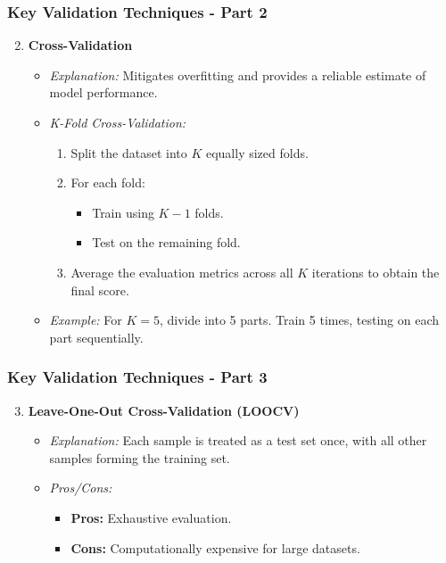 \documentclass[aspectratio=169]{beamer}
\begin{document}
\begin{frame}[fragile]
    \frametitle{Key Validation Techniques - Part 2}
    \begin{enumerate}
        \setcounter{enumi}{1} %
        \item \textbf{Cross-Validation}
        \begin{itemize}
            \item \textit{Explanation:} Mitigates overfitting and provides a reliable estimate of model performance.
            \item \textit{K-Fold Cross-Validation:}
            \begin{enumerate}
                \item Split the dataset into \( K \) equally sized folds.
                \item For each fold:
                \begin{itemize}
                    \item Train using \( K-1 \) folds.
                    \item Test on the remaining fold.
                \end{itemize}
                \item Average the evaluation metrics across all \( K \) iterations to obtain the final score.
            \end{enumerate}
            \item \textit{Example:} For \( K=5 \), divide into 5 parts. Train 5 times, testing on each part sequentially.
        \end{itemize}
    \end{enumerate}
\end{frame}

\begin{frame}[fragile]
    \frametitle{Key Validation Techniques - Part 3}
    \begin{enumerate}
        \setcounter{enumi}{2} %
        \item \textbf{Leave-One-Out Cross-Validation (LOOCV)}
        \begin{itemize}
            \item \textit{Explanation:} Each sample is treated as a test set once, with all other samples forming the training set.
            \item \textit{Pros/Cons:}
            \begin{itemize}
                \item \textbf{Pros:} Exhaustive evaluation.
                \item \textbf{Cons:} Computationally expensive for large datasets.
            \end{itemize}
        \end{itemize}
    \end{enumerate}
\end{frame}
\end{document}
